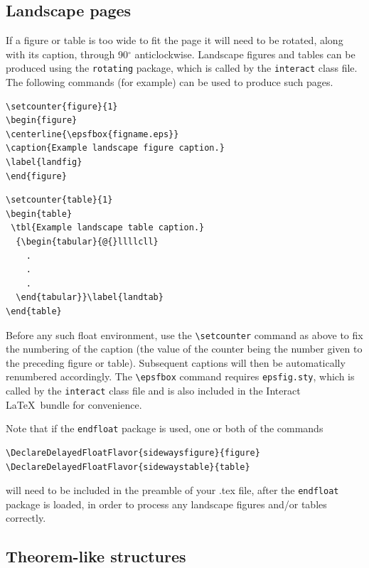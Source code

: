 \documentclass[]{interact}
\theoremstyle{plain}%
\theoremstyle{definition}
\theoremstyle{remark}
\begin{document}
\subsection{Landscape pages}

If a figure or table is too wide to fit the page it will need to be rotated, along with its caption, through 90$^{\circ}$ anticlockwise. Landscape figures and tables can be produced using the \verb"rotating" package, which is called by the \texttt{interact} class file. The following commands (for example) can be used to produce such pages.
\begin{verbatim}
\setcounter{figure}{1}
\begin{figure}
\centerline{\epsfbox{figname.eps}}
\caption{Example landscape figure caption.}
\label{landfig}
\end{figure}
\end{verbatim}
\begin{verbatim}
\setcounter{table}{1}
\begin{table}
 \tbl{Example landscape table caption.}
  {\begin{tabular}{@{}llllcll}
    .
    .
    .
  \end{tabular}}\label{landtab}
\end{table}
\end{verbatim}
Before any such float environment, use the \verb"\setcounter" command as above to fix the numbering of the caption (the value of the counter being the number given to the preceding figure or table). Subsequent captions will then be automatically renumbered accordingly. The \verb"\epsfbox" command requires \verb"epsfig.sty", which is called by the \texttt{interact} class file and is also included in the \textsf{Interact} \LaTeX\ bundle for convenience.

Note that if the \verb"endfloat" package is used, one or both of the commands
\begin{verbatim}
\DeclareDelayedFloatFlavor{sidewaysfigure}{figure}
\DeclareDelayedFloatFlavor{sidewaystable}{table}
\end{verbatim}
will need to be included in the preamble of your .tex file, after the \verb"endfloat" package is loaded, in order to process any landscape figures and/or tables correctly.


\subsection{Theorem-like structures}
\end{document}
